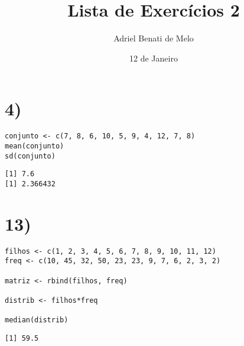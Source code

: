 \documentclass[11pt]{article}
\author{Adriel Benati de Melo}
\date{12 de Janeiro}
\title{Lista de Exercícios 2}
\begin{document}
\maketitle

\section*{4)}
\label{sec:org08bee53}

\begin{verbatim}
conjunto <- c(7, 8, 6, 10, 5, 9, 4, 12, 7, 8)
mean(conjunto)
sd(conjunto)
\end{verbatim}

\begin{verbatim}
[1] 7.6
[1] 2.366432
\end{verbatim}

\section*{13)}
\label{sec:orga3466fe}

\begin{verbatim}
filhos <- c(1, 2, 3, 4, 5, 6, 7, 8, 9, 10, 11, 12)
freq <- c(10, 45, 32, 50, 23, 23, 9, 7, 6, 2, 3, 2)

matriz <- rbind(filhos, freq)

distrib <- filhos*freq

median(distrib)
\end{verbatim}

\begin{verbatim}
[1] 59.5
\end{verbatim}
\end{document}
